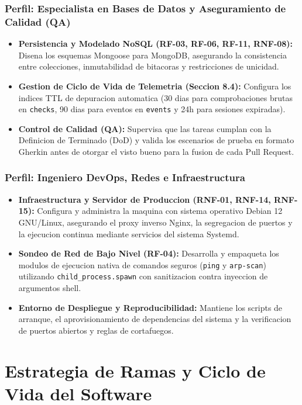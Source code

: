 \documentclass[12pt,a4paper]{report}
\begin{document}
\subsection{Perfil: Especialista en Bases de Datos y Aseguramiento de Calidad (QA)}
\begin{itemize}
  \item \textbf{Persistencia y Modelado NoSQL (RF-03, RF-06, RF-11, RNF-08):} Disena los esquemas Mongoose para MongoDB, asegurando la consistencia entre colecciones, inmutabilidad de bitacoras y restricciones de unicidad.
  \item \textbf{Gestion de Ciclo de Vida de Telemetria (Seccion 8.4):} Configura los indices TTL de depuracion automatica (30 dias para comprobaciones brutas en \texttt{checks}, 90 dias para eventos en \texttt{events} y 24h para sesiones expiradas).
  \item \textbf{Control de Calidad (QA):} Supervisa que las tareas cumplan con la Definicion de Terminado (DoD) y valida los escenarios de prueba en formato Gherkin antes de otorgar el visto bueno para la fusion de cada Pull Request.
\end{itemize}

\subsection{Perfil: Ingeniero DevOps, Redes e Infraestructura}
\begin{itemize}
  \item \textbf{Infraestructura y Servidor de Produccion (RNF-01, RNF-14, RNF-15):} Configura y administra la maquina con sistema operativo Debian 12 GNU/Linux, asegurando el proxy inverso Nginx, la segregacion de puertos y la ejecucion continua mediante servicios del sistema Systemd.
  \item \textbf{Sondeo de Red de Bajo Nivel (RF-04):} Desarrolla y empaqueta los modulos de ejecucion nativa de comandos seguros (\texttt{ping} y \texttt{arp-scan}) utilizando \texttt{child\_process.spawn} con sanitizacion contra inyeccion de argumentos shell.
  \item \textbf{Entorno de Despliegue y Reproducibilidad:} Mantiene los scripts de arranque, el aprovisionamiento de dependencias del sistema y la verificacion de puertos abiertos y reglas de cortafuegos.
\end{itemize}

\newpage
\chapter{Estrategia de Ramas y Ciclo de Vida del Software}
\end{document}
